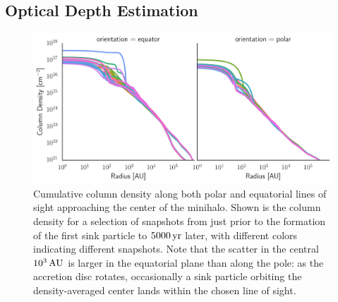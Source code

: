 \documentclass[../thesis.tex]{subfiles}
\begin{document}
\subsection{Optical Depth Estimation}
\label{attenuation}
\begin{figure}
\begin{center}
\includegraphics[width=\columnwidth]{figures/optical_depth/column_density}
\caption{\label{fig:column_density} Cumulative column density along both polar and equatorial lines of sight approaching the center of the minihalo.  Shown is the column density for a selection of snapshots from just prior to the formation of the first sink particle to $5000\,\mathrm{yr}$ later, with different colors indicating different snapshots.  Note that the scatter in the central $10^3\,\mathrm{AU}$ is larger in the equatorial plane than along the pole: as the accretion disc rotates, occasionally a sink particle orbiting the density-averaged center lands within the chosen line of sight.}
\end{center}
\end{figure}
\end{document}

